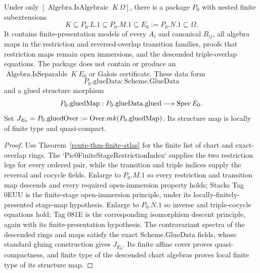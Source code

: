 \begin{theorem}
  \label{route-thm-glue-package}

  Under only \([\operatorname{Algebra.IsAlgebraic}\ K\ \Omega]\), there is a
  package \(P_0\) with nested finite subextensions
  \[
    K\subseteq P_0.L.1\subseteq P_0.M.1\subseteq
      E_0:=P_0.N.1\subseteq\Omega .
  \]
  It contains finite-presentation models of every \(A_i\) and canonical
  \(B_{ij}\), all algebra maps in the restriction and reversed-overlap
  transition families, proofs that restriction maps remain open immersions,
  and the descended triple-overlap equations.  The package does not contain or
  produce an \(\operatorname{Algebra.IsSeparable}\ K\ E_0\) or Galois
  certificate.  These data form
  \[
    P_0.\mathrm{glueData}:\mathrm{Scheme.GlueData}
  \]
  and a glued structure morphism
  \[
    P_0.\mathrm{gluedMap}:P_0.\mathrm{glueData.glued}
      \longrightarrow\operatorname{Spec} E_0.
  \]
  Set
  \(J_{E_0}=P_0.\mathrm{gluedOver}:=\mathrm{Over}.mk(P_0.\mathrm{gluedMap})\).
  Its structure map is locally of finite type and quasi-compact.
\end{theorem}

\begin{proof}
  Use Theorem~\ref{route-thm-finite-atlas} for the finite list of chart and
  exact-overlap rings.  The `Pic0FiniteStageRestrictionIndex` supplies the
  two restriction legs for every ordered pair, while the transition and triple
  indices supply the reversal and cocycle fields.
  Enlarge to \(P_0.M.1\) so every restriction and transition map descends and
  every required open-immersion property holds; Stacks Tag 0EUU is the
  finite-stage open-immersion principle, under its locally-finitely-presented
  stage-map hypothesis.  Enlarge to \(P_0.N.1\) so inverse and triple-cocycle
  equations hold; Tag 081E is the corresponding isomorphism descent principle,
  again with its finite-presentation hypothesis.  The contravariant spectra of the descended
  rings and maps satisfy the exact \(\mathrm{Scheme.GlueData}\) fields, whose
  standard gluing construction gives \(J_{E_0}\).  Its finite affine cover
  proves quasi-compactness, and finite type of the descended chart algebras
  proves local finite type of its structure map.
\end{proof}

